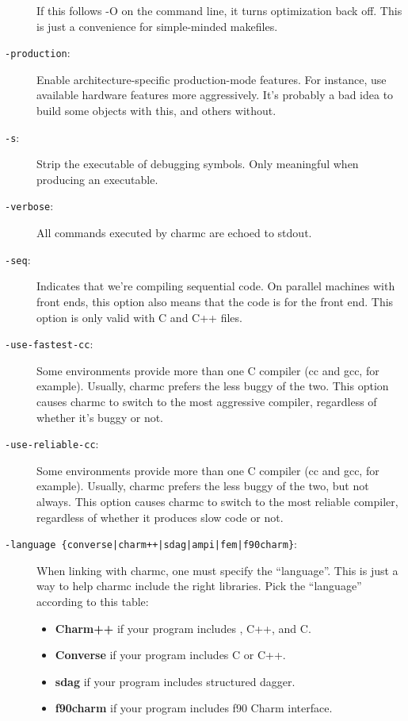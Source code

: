 \begin{description}
If this follows -O on the command line, it turns optimization back off.
This is just a convenience for simple-minded makefiles.

\item[{\tt -production}:]

Enable architecture-specific production-mode features. For instance,
use available hardware features more aggressively. It's probably a bad
idea to build some objects with this, and others without.

\item[{\tt -s}:]

Strip the executable of debugging symbols.  Only meaningful when
producing an executable.

\item[{\tt -verbose}:]

All commands executed by charmc are echoed to stdout.

\item[{\tt -seq}:]

Indicates that we're compiling sequential code.  On parallel machines
with front ends, this option also means that the code is for the front
end.  This option is only valid with C and C++ files.

\item[{\tt -use-fastest-cc}:]

Some environments provide more than one C compiler (cc and gcc, for
example).  Usually, charmc prefers the less buggy of the two.  This
option causes charmc to switch to the most aggressive compiler,
regardless of whether it's buggy or not.

\item[{\tt -use-reliable-cc}:]

Some environments provide more than one C compiler (cc and gcc, for
example).  Usually, charmc prefers the less buggy of the two, but
not always.  This option causes charmc to switch to the most reliable
compiler, regardless of whether it produces slow code or not.

\item[{\tt -language \{converse|charm++|sdag|ampi|fem|f90charm\}}:]

When linking with charmc, one must specify the ``language''.  This
is just a way to help charmc include the right libraries.  Pick the
``language'' according to this table:

\begin{itemize}
\item{{\bf Charm++} if your program includes \charmpp{}, C++, and C.}
\item{{\bf Converse} if your program includes C or C++.}
\item{{\bf sdag} if your program includes structured dagger.}
\item{{\bf f90charm} if your program includes f90 Charm interface.}
\end{itemize}


\end{description}
